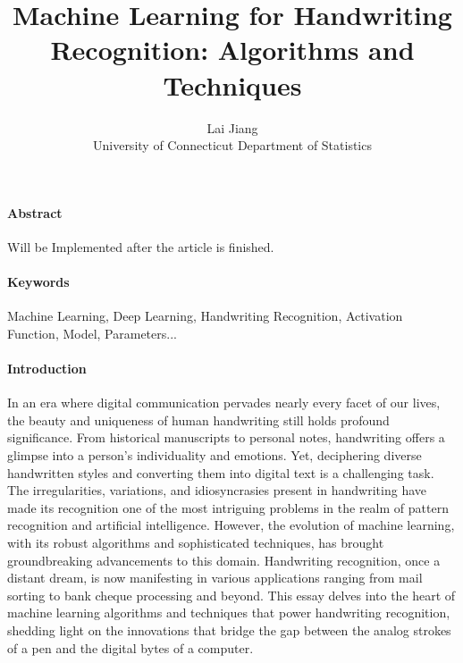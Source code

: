 \documentclass[12pt]{article}
\title{Machine Learning for Handwriting Recognition: Algorithms and Techniques}
\author{Lai Jiang\\
  University of Connecticut Department of Statistics
}
\begin{document}
\maketitle

\paragraph{Abstract}
Will be Implemented after the article is finished.

\paragraph{Keywords}
Machine Learning, Deep Learning, Handwriting Recognition, Activation Function, Model, Parameters...

\paragraph{Introduction}
In an era where digital communication pervades nearly every facet of our lives, the beauty and uniqueness of human handwriting still holds profound significance. From historical manuscripts to personal notes, handwriting offers a glimpse into a person's individuality and emotions. Yet, deciphering diverse handwritten styles and converting them into digital text is a challenging task. The irregularities, variations, and idiosyncrasies present in handwriting have made its recognition one of the most intriguing problems in the realm of pattern recognition and artificial intelligence. However, the evolution of machine learning, with its robust algorithms and sophisticated techniques, has brought groundbreaking advancements to this domain. Handwriting recognition, once a distant dream, is now manifesting in various applications ranging from mail sorting to bank cheque processing and beyond. This essay delves into the heart of machine learning algorithms and techniques that power handwriting recognition, shedding light on the innovations that bridge the gap between the analog strokes of a pen and the digital bytes of a computer.
\end{document}

